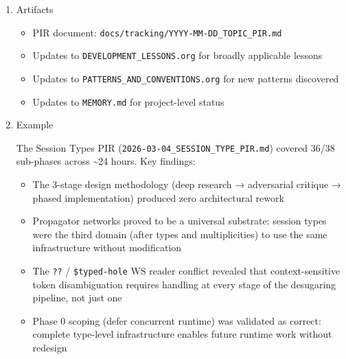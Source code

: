 \documentclass[11pt]{article}
\begin{document}
\begin{enumerate}
Not every change warrants a PIR. Use one when:
\begin{itemize}
\item The feature spanned multiple phases or sub-phases
\item The implementation took more than a single session
\item The work involved architectural decisions (new AST nodes, new
infrastructure files, new cross-cutting concerns)
\item You learned something that future work should benefit from
\end{itemize}

Skip for routine bug fixes, single-file changes, or features that
followed established patterns without surprises.
\item Artifacts
\label{sec:orge21090e}

\begin{itemize}
\item PIR document: \texttt{docs/tracking/YYYY-MM-DD\_TOPIC\_PIR.md}
\item Updates to \texttt{DEVELOPMENT\_LESSONS.org} for broadly applicable lessons
\item Updates to \texttt{PATTERNS\_AND\_CONVENTIONS.org} for new patterns discovered
\item Updates to \texttt{MEMORY.md} for project-level status
\end{itemize}
\item Example
\label{sec:orgf488a02}

The Session Types PIR (\texttt{2026-03-04\_SESSION\_TYPE\_PIR.md}) covered 36/38
sub-phases across \textasciitilde{}24 hours. Key findings:
\begin{itemize}
\item The 3-stage design methodology (deep research → adversarial critique →
phased implementation) produced zero architectural rework
\item Propagator networks proved to be a universal substrate: session types
were the third domain (after types and multiplicities) to use the
same infrastructure without modification
\item The \texttt{??} / \texttt{\$typed-hole} WS reader conflict revealed that
context-sensitive token disambiguation requires handling at every
stage of the desugaring pipeline, not just one
\item Phase 0 scoping (defer concurrent runtime) was validated as correct:
complete type-level infrastructure enables future runtime work without
redesign
\end{itemize}
\end{enumerate}
\end{document}
